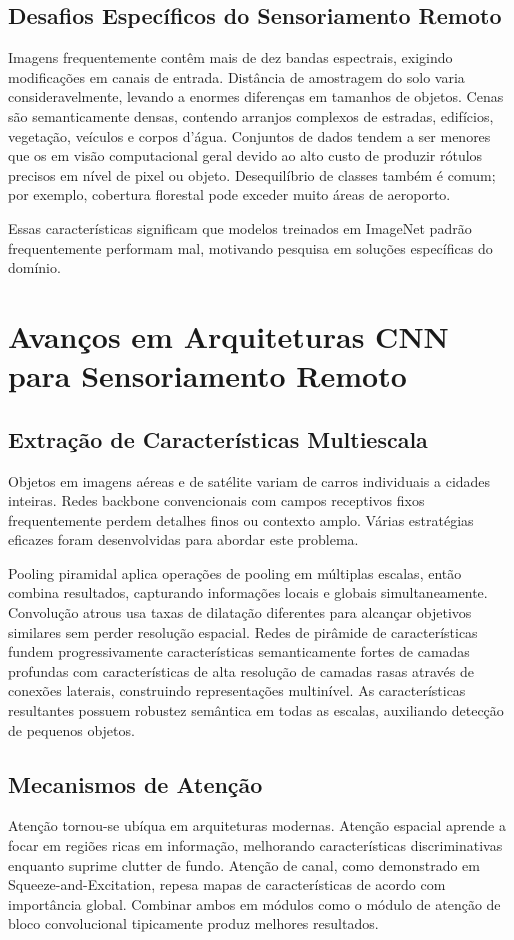 \documentclass[12pt,a4paper]{article}
\begin{document}
\subsection{Desafios Específicos do Sensoriamento Remoto}
Imagens frequentemente contêm mais de dez bandas espectrais, exigindo modificações em canais de entrada. Distância de amostragem do solo varia consideravelmente, levando a enormes diferenças em tamanhos de objetos. Cenas são semanticamente densas, contendo arranjos complexos de estradas, edifícios, vegetação, veículos e corpos d'água. Conjuntos de dados tendem a ser menores que os em visão computacional geral devido ao alto custo de produzir rótulos precisos em nível de pixel ou objeto. Desequilíbrio de classes também é comum; por exemplo, cobertura florestal pode exceder muito áreas de aeroporto.

Essas características significam que modelos treinados em ImageNet padrão frequentemente performam mal, motivando pesquisa em soluções específicas do domínio.

\section{Avanços em Arquiteturas CNN para Sensoriamento Remoto}
\label{sec:developments}
\subsection{Extração de Características Multiescala}
Objetos em imagens aéreas e de satélite variam de carros individuais a cidades inteiras. Redes backbone convencionais com campos receptivos fixos frequentemente perdem detalhes finos ou contexto amplo. Várias estratégias eficazes foram desenvolvidas para abordar este problema.

Pooling piramidal aplica operações de pooling em múltiplas escalas, então combina resultados, capturando informações locais e globais simultaneamente. Convolução atrous usa taxas de dilatação diferentes para alcançar objetivos similares sem perder resolução espacial. Redes de pirâmide de características fundem progressivamente características semanticamente fortes de camadas profundas com características de alta resolução de camadas rasas através de conexões laterais, construindo representações multinível. As características resultantes possuem robustez semântica em todas as escalas, auxiliando detecção de pequenos objetos.

\subsection{Mecanismos de Atenção}
Atenção tornou-se ubíqua em arquiteturas modernas. Atenção espacial aprende a focar em regiões ricas em informação, melhorando características discriminativas enquanto suprime clutter de fundo. Atenção de canal, como demonstrado em Squeeze-and-Excitation, repesa mapas de características de acordo com importância global. Combinar ambos em módulos como o módulo de atenção de bloco convolucional tipicamente produz melhores resultados.
\end{document}
